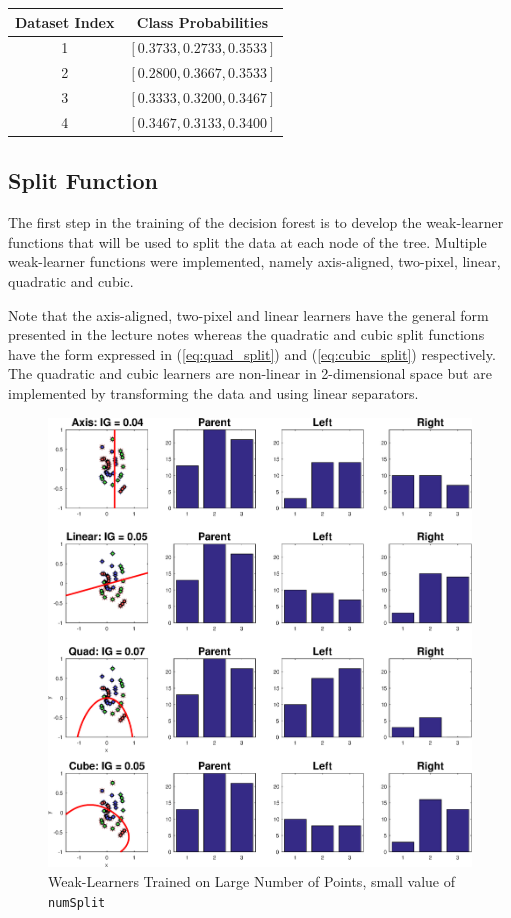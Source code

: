 \documentclass[a4paper,pra,twocolumn,10pt,aps,longbibliography,nobalancelastpage]{article}
\begin{document}
\begin{table}[H]
\centering
\begin{tabular}{|c|c|}
\hline
Dataset Index & Class Probabilities 		\\ \hline
1             & $[0.3733, 0.2733, 0.3533]$  	\\ \hline
2             & $[0.2800, 0.3667, 0.3533]$  	\\ \hline
3             & $[0.3333, 0.3200, 0.3467]$ 	\\ \hline
4             & $[0.3467, 0.3133, 0.3400]$  	\\ \hline
\end{tabular}
\end{table}

\subsection{Split Function}

The first step in the training of the decision forest is to develop the weak-learner functions that will be used to split the data at each node of the tree. Multiple weak-learner functions were implemented, namely axis-aligned, two-pixel, linear, quadratic and cubic.


Note that the axis-aligned, two-pixel and linear learners have the general form presented in the lecture notes whereas the quadratic and cubic split functions have the form expressed in (\ref{eq:quad_split}) and (\ref{eq:cubic_split}) respectively. The quadratic and cubic learners are non-linear in 2-dimensional space but are implemented by transforming the data and using linear separators.

\begin{figure}[H]
	\centering
    \includegraphics[width=0.60\columnwidth]{split_function_visualitions_1}
    \caption{Weak-Learners Trained on Large Number of Points, small value of \texttt{numSplit}}
    \label{fig:ex_func}
\end{figure}
\end{document}
